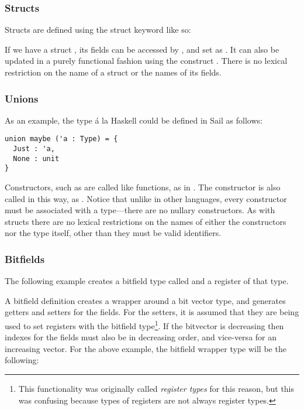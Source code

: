 \subsubsection{Structs}

Structs are defined using the struct keyword like so:


If we have a struct , its fields can be accessed by
, and set as . It can also be updated in
a purely functional fashion using the construct . There is no lexical restriction on the name of a struct or
the names of its fields.

\subsubsection{Unions}
\label{sec:union}

As an example, the  type \'{a} la Haskell could be defined
in Sail as follows:
\begin{lstlisting}
union maybe ('a : Type) = {
  Just : 'a,
  None : unit
}
\end{lstlisting}
Constructors, such as  are called like functions, as in
. The  constructor is also called in
this way, as . Notice that unlike in other languages, every
constructor must be associated with a type---there are no nullary
constructors. As with structs there are no lexical restrictions on the
names of either the constructors nor the type itself, other than they
must be valid identifiers.

\subsubsection{Bitfields}

The following example creates a bitfield type called  and a
register  of that type.



A bitfield definition creates a wrapper around a bit vector type, and
generates getters and setters for the fields. For the setters, it is
assumed that they are being used to set registers with the bitfield
type\footnote{This functionality was originally called \emph{register
    types} for this reason, but this was confusing because types of
  registers are not always register types.}. If the bitvector is
decreasing then indexes for the fields must also be in decreasing
order, and vice-versa for an increasing vector. For the above example,
the bitfield wrapper type will be the following:

